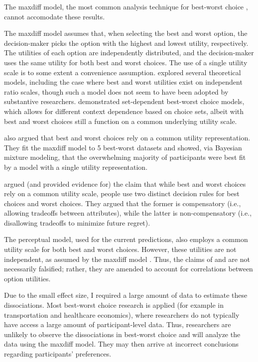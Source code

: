 The maxdiff model, the most common analysis technique for best-worst choice \parencite{marleyProbabilisticModelsBest2005,hawkinsBestTimesWorst2014,muhlbacher2016experimental,de2017relations}, cannot accomodate these results.  

The maxdiff model assumes that, when selecting the best and worst option, the decision-maker picks the option with the highest and lowest utility, respectively. The utilities of each option are independently distributed, and the decision-maker uses the same utility for both best and worst choices. The use of a single utility scale is to some extent a convenience assumption. \textcite{marleyProbabilisticModelsBest2005} explored several theoretical models, including the case where best and worst utilities exist on independent ratio scales, though such a model does not seem to have been adopted by substantive researchers. \textcite{marleyProbabilisticModelsSetdependent2008} demonstrated set-dependent best-worst choice models, which allows for different context dependence based on choice sets, albeit with best and worst choices still a function on a common underlying utility scale. 

\textcite{hawkins2019like} also argued that best and worst choices rely on a common utility representation. They fit the maxdiff model to 5 best-worst datasets and showed, via Bayesian mixture modeling, that the overwhelming majority of participants were best fit by a model with a single utility representation. 

\textcite{gervzinivc2021estimating} argued (and provided evidence for) the claim that while best and worst choices rely on a common utility scale, people use two distinct decision rules for best choices and worst choices. They argued that the former is compensatory (i.e., allowing tradeoffs between attributes), while the latter is non-compensatory (i.e., disallowing tradeoffs to minimize future regret). 

The perceptual model, used for the current predictions, also employs a common utility scale for both best and worst choices. However, these utilities are not independent, as assumed by the maxdiff model \parencite{de2017relations}. Thus, the claims of \textcite{hawkinsBestTimesWorst2014} and \textcite{hawkins2019like} are not necessarily falsified; rather, they are amended to account for correlations between option utilities.

Due to the small effect size, I required a large amount of data to estimate these dissociations. Most best-worst choice research is applied (for example in transportation and healthcare economics), where researchers do not typically have access a large amount of participant-level data. Thus, researchers are unlikely to observe the dissociations in best-worst choice and will analyze the data using the maxdiff model. They may then arrive at incorrect conclusions regarding participants' preferences. 

